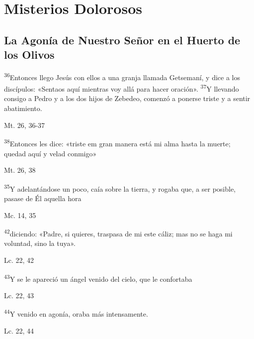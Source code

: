 \documentclass[a4paper,11pt]{article}
\begin{document}
    \newpage
        
  \section*{\hfil Misterios Dolorosos \hfil}
    
    \subsection*{\hfil La Agonía de Nuestro Señor en el Huerto de los Olivos \hfil}
      
      \textsuperscript{36}Entonces llego Jesús con ellos a una granja llamada Getsemaní, y dice a los discípulos: «Sentaos aquí mientras voy allá para hacer oración». 
      \textsuperscript{37}Y llevando consigo a Pedro y a los dos hijos de Zebedeo, comenzó a ponerse triste y a sentir abatimiento.
      \begin{flushright}
        Mt. 26, 36-37     
      \end{flushright}

      \textsuperscript{38}Entonces les dice: «triste em gran manera está mi alma hasta la muerte; quedad aquí y velad conmigo»
      \begin{flushright}
        Mt. 26, 38
      \end{flushright}

      \textsuperscript{35}Y adelantándose un poco, caía sobre la tierra, y rogaba que, a ser posible, pasase de Él aquella hora
      \begin{flushright}
        Mc. 14, 35  
      \end{flushright}

      \textsuperscript{42}diciendo: «Padre, si quieres, traspasa de mi este cáliz; mas no se haga mi voluntad, sino la tuya».
      \begin{flushright}
        Lc. 22, 42
      \end{flushright}

      \textsuperscript{43}Y se le apareció un ángel venido del cielo, que le confortaba
      \begin{flushright}
        Lc. 22, 43
      \end{flushright}

      \textsuperscript{44}Y venido en agonía, oraba más intensamente. 
      \begin{flushright}
        Lc. 22, 44
      \end{flushright}
\end{document}
